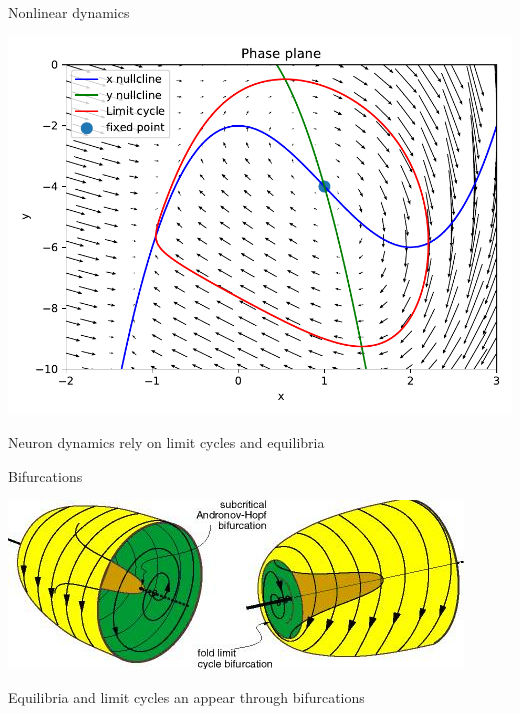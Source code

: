 \documentclass[presentation]{beamer}
\begin{document}
\begin{frame}[label={sec:orgd4faa9a}]{Nonlinear dynamics}
\begin{center}
\includegraphics[trim={0cm 0.5cm 0cm 0cm}, clip,height=.75\textheight]{./phaseplane.pdf}
\end{center}

Neuron dynamics rely on limit cycles and equilibria
\end{frame}


\begin{frame}[label={sec:orge7a70e4}]{Bifurcations}
\begin{center}
\includegraphics[width=.9\linewidth]{./Ellburst.jpg}
\end{center}

Equilibria and limit cycles an appear through bifurcations
\end{frame}
\end{document}
